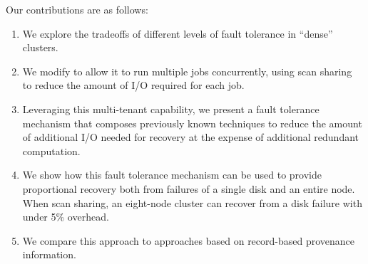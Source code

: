 Our contributions are as follows:

\begin{enumerate}
  \item We explore the tradeoffs of different levels of fault tolerance in
    ``dense'' clusters.
  \item We modify \themis to allow it to run multiple jobs concurrently, using
    scan sharing~\cite{nova, qptmd, coscan} to reduce the amount of I/O
    required for each job.
  \item Leveraging this multi-tenant capability, we present a fault tolerance
    mechanism that composes previously known techniques to reduce the amount of
    additional I/O needed for recovery at the expense of additional redundant
    computation.
  \item We show how this fault tolerance mechanism can be used to provide
    proportional recovery both from failures of a single disk and an entire
    node. When scan sharing, an eight-node \themis cluster can recover from a
    disk failure with under 5\% overhead.
  \item We compare this approach to approaches based on record-based provenance
    information.
\end{enumerate}
